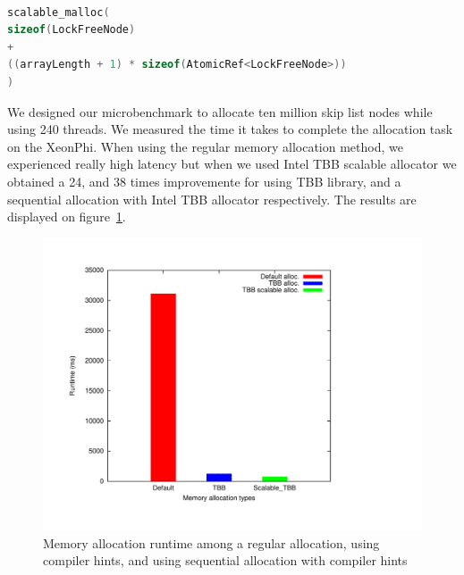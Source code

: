 \begin{lstlisting}[language=C++,basicstyle=\tt\footnotesize,captionpos=b,caption=Memory allocation instruction for array of atomic references,label=lst:fn_alloc, morekeywords={*, size_t}]

scalable_malloc(
sizeof(LockFreeNode) 
+ 
((arrayLength + 1) * sizeof(AtomicRef<LockFreeNode>))
)
\end{lstlisting}

We designed our microbenchmark to allocate ten million skip list nodes while using 240 threads. We measured the time it takes to complete the allocation task on the XeonPhi. When using the regular memory allocation method, we experienced really high latency but when we used Intel TBB scalable allocator we obtained a 24, and 38 times improvemente for using TBB library, and a sequential allocation with Intel TBB allocator respectively. The results are displayed on figure~\ref{fig:mem_alloc}.


\begin{figure}
	\centering
  	\includegraphics[scale=0.35]{../plots/mem_alloc/mem_alloc.pdf}
	\caption{Memory allocation runtime among a regular allocation, using compiler hints, and using sequential allocation with compiler hints}
	\label{fig:mem_alloc}
\end{figure}

